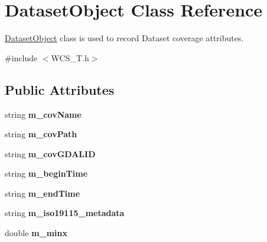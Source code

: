 \hypertarget{classDatasetObject}{
\section{DatasetObject Class Reference}
\label{classDatasetObject}
}


\hyperlink{classDatasetObject}{DatasetObject} class is used to record Dataset coverage attributes.  




{\ttfamily \#include $<$WCS\_\-T.h$>$}

\subsection*{Public Attributes}
\begin{DoxyCompactItemize}
\item 
\hypertarget{classDatasetObject_a803829c671a88994894e7b22d8e03ea7}{
string {\bfseries m\_\-covName}}
\label{classDatasetObject_a803829c671a88994894e7b22d8e03ea7}

\item 
\hypertarget{classDatasetObject_a9c32f730556bff8e3505d60475b10af7}{
string {\bfseries m\_\-covPath}}
\label{classDatasetObject_a9c32f730556bff8e3505d60475b10af7}

\item 
\hypertarget{classDatasetObject_a883f469d3cb8efae677e680c6baa26cd}{
string {\bfseries m\_\-covGDALID}}
\label{classDatasetObject_a883f469d3cb8efae677e680c6baa26cd}

\item 
\hypertarget{classDatasetObject_a5cde536f5be45410f59fd8dfdf28c1b6}{
string {\bfseries m\_\-beginTime}}
\label{classDatasetObject_a5cde536f5be45410f59fd8dfdf28c1b6}

\item 
\hypertarget{classDatasetObject_ac92e0ee1ff977fec4446c61569ec681f}{
string {\bfseries m\_\-endTime}}
\label{classDatasetObject_ac92e0ee1ff977fec4446c61569ec681f}

\item 
\hypertarget{classDatasetObject_ac24af24c6999cb5b19642f1bf595b419}{
string {\bfseries m\_\-iso19115\_\-metadata}}
\label{classDatasetObject_ac24af24c6999cb5b19642f1bf595b419}

\item 
\hypertarget{classDatasetObject_afef38387d946f506fadcd1b1f8c27223}{
double {\bfseries m\_\-minx}}
\label{classDatasetObject_afef38387d946f506fadcd1b1f8c27223}


\end{DoxyCompactItemize}

